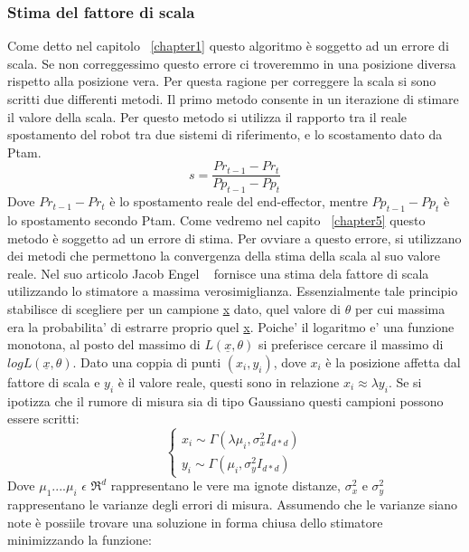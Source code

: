 \subsubsection{Stima del fattore di scala}
Come detto nel capitolo ~\ref{chapter1} questo algoritmo è soggetto ad un errore di scala. Se non correggessimo questo errore ci troveremmo in una posizione diversa rispetto alla posizione vera. Per questa ragione per correggere la scala si sono scritti due differenti metodi. 
Il primo metodo consente in un iterazione di stimare il valore della scala. Per questo metodo si utilizza il rapporto tra il reale spostamento del robot tra due sistemi di riferimento, e lo scostamento dato da Ptam.
\begin{equation}
s = \frac{Pr_{t-1} - Pr_{t}}{Pp_{t-1} - Pp_{t}}
\label{stima della scala primo metodo}
\end{equation}
Dove $Pr_{t-1} - Pr_{t}$ è lo spostamento reale del end-effector, mentre $Pp_{t-1} - Pp_{t}$ è lo spostamento secondo Ptam. Come vedremo nel capito ~\ref{chapter5} questo metodo è soggetto ad un errore di stima. Per ovviare a questo errore, si utilizzano dei metodi che permettono la convergenza della stima della scala al suo valore reale. Nel suo articolo Jacob Engel  ~\cite{scale} fornisce una stima dela fattore di scala utilizzando lo stimatore a massima verosimiglianza. Essenzialmente tale principio stabilisce di scegliere per un campione \underline{x} dato, quel valore di $\theta$ per cui massima era la probabilita' di estrarre proprio quel \underline{x}. Poiche' il logaritmo e' una funzione monotona, al posto del massimo di $L(\underline{x}, \theta)$ si preferisce cercare il massimo di $log L(\underline{x}, \theta)$. Dato una coppia di punti $(x_i, y_i)$, dove $x_i$ è la posizione affetta dal fattore di scala e $y_i$ è il valore reale, questi sono in relazione $x_i \approx \lambda y_i $. Se si ipotizza che il rumore di misura sia di tipo Gaussiano questi campioni possono essere scritti:
\begin{equation}
\begin{cases}
x_i \sim \Gamma(\lambda \mu_i, \sigma_x^2 I_{d*d})	\\
y_i \sim \Gamma(\mu_i, \sigma_y^2 I_{d*d})
\end{cases}
\label{rumore di misura}
\end{equation}
Dove $\mu_1 .... \mu_i$  $\epsilon$ $\Re^{d}$ rappresentano le vere ma ignote distanze, $\sigma_x^2$ e $\sigma_y^2$ rappresentano le varianze degli errori di misura.
Assumendo che le varianze siano note è possiile trovare una soluzione in forma chiusa dello stimatore minimizzando la funzione: 

